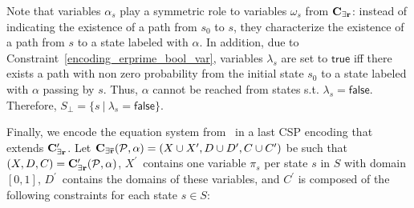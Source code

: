 \documentclass{llncs}
\newcommand{\csp}{\textnormal{CSP}}
\newcommand{\Mer}{\ensuremath{{\bf C_{{\exists}r}}}}
\newcommand{\MerPrime}{\ensuremath{{\bf C^{\prime}_{{\exists}r}}}}
\newcommand{\MerExt}{\ensuremath{{\bf C_{{\exists}\bar{r}}}}}
\newcommand{\ttransition}[1]{\ensuremath{\theta_{#1}}}
\newcommand{\transition}[2]{\ensuremath{\ttransition{#1}^{#2}}}
\newcommand{\Succ}{\ensuremath{{\tt{Succ}}}}
\newcommand{\true}             {\ensuremath{\mathsf{true}}}
\newcommand{\false}            {\ensuremath{\mathsf{false}}}
\begin{document}
\smallskip



Note that  variables $\alpha_s$ play a symmetric role to 
variables $\omega_s$ from $\Mer$: instead of indicating the existence
of a path from $s_0$ to $s$, they characterize the existence of a path
from $s$ to a state labeled with $\alpha$. In addition, due to
Constraint~\ref{encoding_erprime_bool_var},  variables $\lambda_s$ are set to {\true} iff
there exists a path with non zero probability from the initial state
$s_0$ to a state labeled with $\alpha$ passing by $s$. Thus, $\alpha$ cannot be reached from states s.t.
$\lambda_s = \false$.
Therefore, $S_\bot = \{s \ |\ \lambda_s = \false\}$.

Finally, we encode the equation system from~\cite{Baier2008PMC} in a
last {\csp} encoding that extends $\MerPrime$. Let
$\MerExt(\mathcal{P}, \alpha) = (X \cup X^\prime,D \cup D^\prime,C
\cup C^\prime)$ be such that $(X,D,C) = \MerPrime(\mathcal{P},
\alpha)$, $X^\prime$~contains one variable $\pi_s$ per state $s$ in
$S$ with domain $[0, 1]$, $D^\prime$~contains the domains of these
variables, and $C^\prime$ is composed of the following constraints for
each state $s \in S$:
\end{document}
